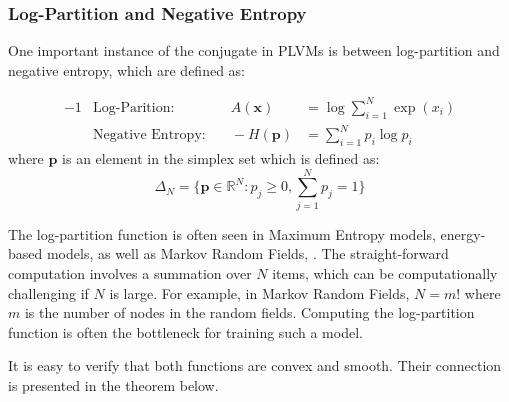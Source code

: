 \subsubsection{Log-Partition and Negative Entropy}

One important instance of the conjugate in PLVMs is between log-partition and
negative entropy, which are defined as:

\begin{alignat}{-1}
  &\text{Log-Parition:} & \quad
  A(\mathbf{x}) &= \log \sum\limits_{i = 1}^N \exp(x_i) \\
  &\text{Negative Entropy:} & \quad
  - H(\mathbf{p}) &= \sum\limits_{i = 1}^N p_i \log p_i
\end{alignat}
where $\mathbf{p}$ is an element in the simplex set which is defined as:
$$\Delta_N = \{\mathbf{p} \in
  \mathbb{R}^{N}: p_j \ge 0, \sum\limits_{j=1}^N p_j = 1\}$$

The log-partition function is often seen in Maximum Entropy models, energy-based
models, as well as Markov Random Fields, \etc. The straight-forward computation
involves a summation over $N$ items, which can be computationally challenging if
$N$ is large. For example, in Markov Random Fields, $N = m!$  where  $m$ is the
number of nodes in the random fields. Computing the log-partition function is
often the bottleneck for training such a model.

It is easy to verify that both functions are convex and smooth. Their connection
is presented in the theorem below.

